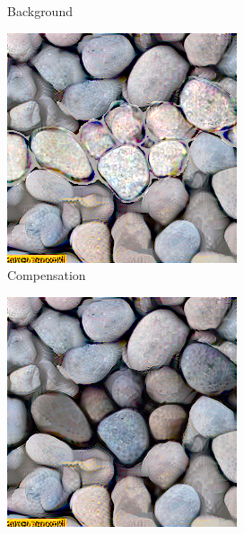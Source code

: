 \begin{figure}[]
\begin{subfigure}{\textwidth}
\begin{subfigure}{0.24\textwidth}
            \caption{Background}
            \label{fig:ex01-pebbles-1000steps-some_bg}
        \end{subfigure}
        \hfill
        \begin{subfigure}{0.24\textwidth}
            \centering
            \includegraphics[width=\textwidth]{images/04-experiment01/pebbles/1000/some_im.jpg}
            \caption{Compensation}
            \label{fig:ex01-pebbles-1000steps-some_im}
        \end{subfigure}
        \hfill
        \begin{subfigure}{0.24\textwidth}
            \centering
            \includegraphics[width=\textwidth]{images/04-experiment01/pebbles/1000/some_proj.jpg}

\end{subfigure}
\end{subfigure}
\end{figure}
